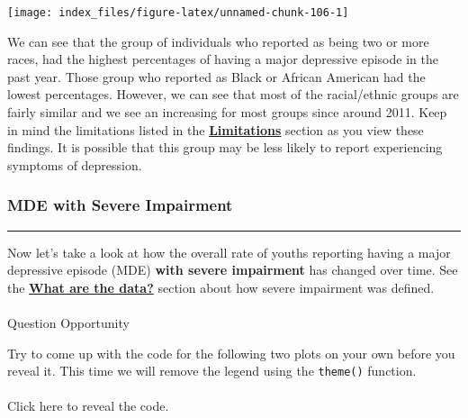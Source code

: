 \documentclass[
]{article}
\begin{document}
\begin{center}\texttt{[image: index\_files/figure-latex/unnamed-chunk-106-1]} \end{center}

We can see that the group of individuals who reported as being two or
more races, had the highest percentages of having a major depressive
episode in the past year. Those group who reported as Black or African
American had the lowest percentages. However, we can see that most of
the racial/ethnic groups are fairly similar and we see an increasing for
most groups since around 2011. Keep in mind the limitations listed in
the \protect\hyperlink{limitations}{\textbf{Limitations}} section as you
view these findings. It is possible that this group may be less likely
to report experiencing symptoms of depression.

\hypertarget{mde-with-severe-impairment}{%
\subsubsection{\texorpdfstring{\textbf{MDE with Severe
Impairment}}{MDE with Severe Impairment}}\label{mde-with-severe-impairment}}

\begin{center}\rule{0.5\linewidth}{0.5pt}\end{center}

Now let's take a look at how the overall rate of youths reporting having
a major depressive episode (MDE) \textbf{with severe impairment} has
changed over time. See the
\protect\hyperlink{what-are-the-data}{\textbf{What are the data?}}
section about how severe impairment was defined.

\hypertarget{section-26}{%
\paragraph{}\label{section-26}}

Question Opportunity

Try to come up with the code for the following two plots on your own
before you reveal it. This time we will remove the legend using the
\texttt{theme()} function.

\hypertarget{section-27}{%
\paragraph{}\label{section-27}}

Click here to reveal the code.
\end{document}
